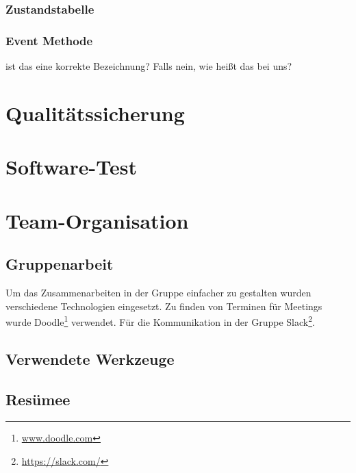 \subsection*{Zustandstabelle}
\subsection*{Event Methode}
ist das eine korrekte Bezeichnung? Falls nein, wie heißt das bei uns?


\chapter{Qualitätssicherung}


\chapter{Software-Test}


\chapter{Team-Organisation}
\section{Gruppenarbeit}
Um das Zusammenarbeiten in der Gruppe einfacher zu gestalten wurden verschiedene Technologien eingesetzt.
Zu finden von Terminen für Meetings wurde Doodle\footnote{\url{www.doodle.com}}  verwendet. Für die Kommunikation in der Gruppe Slack\footnote{\url{https://slack.com/}}.
\section{Verwendete Werkzeuge}
\section{Resümee}